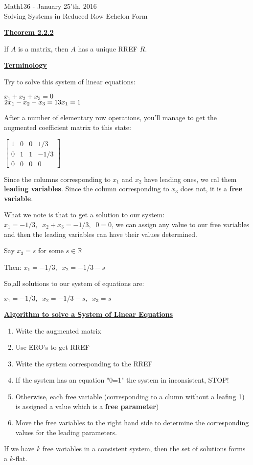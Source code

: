 \documentclass{letter}
\newcommand{\0}[1]{\begin{bmatrix}#1\end{bmatrix}}
\newcommand{\h}[1]{\underline{\textbf{#1}}}
\begin{document}
	\begin{center}
		\LARGE Math136 - January 25'th, 2016\\
		\large Solving Systems in Reduced Row Echelon Form
	\end{center}
	\vspace{0.25 in}
	
	\h{Theorem 2.2.2}

	If $A$ is a matrix, then $A$ has a unique RREF $R$.
	
	\h{Terminology}
	
	Try to solve this system of linear equations:
	
	$x_1 + x_2 + x_3 = 0$\\
	$2x_1 - x_2 - x_3 = 1\\
	3x_1 = 1$
	
	After a number of elementary row operations, you'll manage to get the augmented coefficient matrix to this state:
	
	$\left[\begin{array}{ccc|c}
	1&0&0&1/3\\0&1&1&-1/3\\0&0&0&0
	\end{array}\right]$
	
	Since the columns corresponding to $x_1$ and $x_2$ have leading ones, we cal them \textbf{leading variables}. Since the column corresponding to $x_3$ does not, it is a \textbf{free variable}.
	
	What we note is that to get a solution to our system: $x_1 = -1/3,\;\;x_2 + x_3 = -1/3,\;\; 0=0$, we can assign any value to our free variables and then the leading variables can have their values determined.
	
	Say $x_3 = s$ for some $s \in \mathbb{R}$
	
	Then: $x_1 = -1/3,\;\; x_2 = -1/3 - s$
	
	So,all solutions to our system of equations are:
	
	$x_1 = -1/3,\;\; x_2 = -1/3 - s,\;\; x_3 = s$
	
	\h{Algorithm to solve a System of Linear Equations}
	
	\begin{enumerate}
		\item Write the augmented matrix
		\item Use ERO's to get RREF
		\item Write the system corresponding to the RREF
		\item If the system has an equation "0=1" the system in inconsistent, STOP!
		\item Otherwise, each free variable (corresponding to a clumn without a leafing 1) is assigned a value which is a \textbf{free parameter})
		\item Move the free variables to the right hand side to determine the corresponding values for the leading parameters.
	\end{enumerate}
	
	If we have $k$ free variables in a consistent system, then the set of solutions forms a $k$-flat.
\end{document}

